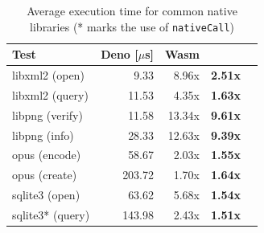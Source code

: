 \begin{table}[!t]
	\centering
	\setlength{\tabcolsep}{3.2mm}
	\begin{tabular*}{0.7\columnwidth}{l r r r r}
		\toprule
		{\bf Test} & {\bf Deno \scriptsize{[$\mu$s]}} & {\bf Wasm} & {\bf \natisand}\\
		\midrule
		libxml2 (open)  & 9.33      & 8.96x     & \bf{2.51x}    \\
		libxml2 (query)	& 11.53     & 4.35x     & \bf{1.63x}    \\
		libpng (verify) & 11.58     & 13.34x    & \bf{9.61x}    \\
		libpng (info)   & 28.33     & 12.63x    & \bf{9.39x}    \\
		opus (encode)   & 58.67     & 2.03x     & \bf{1.55x}    \\
		opus (create)   & 203.72    & 1.70x     & \bf{1.64x}    \\         
		sqlite3 (open)  & 63.62     & 5.68x     & \bf{1.54x}    \\
		sqlite3* (query) & 143.98    & 2.43x     & \bf{1.51x}    \\ 

		\bottomrule
	\end{tabular*}
	\caption[Average execution time for common native libraries]{
		\label{table:native-lib-overhead} Average execution time for
		common native libraries (* marks the use of {\tt nativeCall})
	}
\end{table}
%
